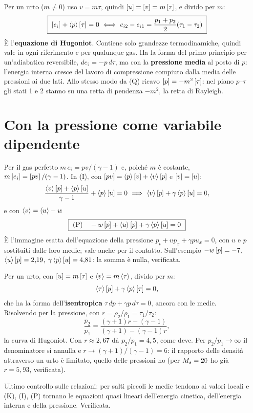 Per un urto ($m\neq0$) uso $v=m\tau$, quindi $\left[u\right]=\left[v\right]=m\left[\tau\right]$, e divido per $m$:
\[
  \boxed{\ \jp{e_i}+\av{p}\jp{\tau}=0
  \ \Longleftrightarrow\ e_{i2}-e_{i1}=\frac{p_1+p_2}{2}(\tau_1-\tau_2)\ }
\]
È l'\textbf{equazione di Hugoniot}. Contiene solo grandezze termodinamiche, quindi vale in ogni riferimento e per
qualunque gas. Ha la forma del primo principio per un'adiabatica reversibile, $de_i=-p\,d\tau$, ma con la
\textbf{pressione media} al posto di $p$: l'energia interna cresce del lavoro di compressione compiuto dalla media
delle pressioni ai due lati. Allo stesso modo da (Q) ricavo $\left[p\right]=-m^2\left[\tau\right]$: nel piano $p$--$\tau$ gli stati
1 e 2 stanno su una retta di pendenza $-m^2$, la retta di Rayleigh.

\section*{Con la pressione come variabile dipendente}
Per il gas perfetto $m\,e_i=pv/(\gamma-1)$ e, poiché $m$ è costante, $m\left[e_i\right]=\left[pv\right]/(\gamma-1)$. In (I), con
$\left[pv\right]=\left\langle p\right\rangle\left[v\right]+\left\langle v\right\rangle\left[p\right]$ e $\left[v\right]=\left[u\right]$:
\[
  \frac{\left\langle v\right\rangle\left[p\right]+\left\langle p\right\rangle\left[u\right]}{\gamma-1}+\left\langle p\right\rangle\left[u\right]=0
  \ \Longrightarrow\ \left\langle v\right\rangle\left[p\right]+\gamma\left\langle p\right\rangle\left[u\right]=0,
\]
e con $\left\langle v\right\rangle=\left\langle u\right\rangle-w$
\[
  \boxed{\ \text{(P)}\quad -w\left[p\right]+\left\langle u\right\rangle\left[p\right]+\gamma\left\langle p\right\rangle\left[u\right]=0\ }
\]
È l'immagine esatta dell'equazione della pressione $p_t+up_x+\gamma pu_x=0$, con $u$ e $p$ sostituiti dalle loro
medie; vale anche per il contatto. Sull'esempio $-w\left[p\right]=-7$, $\left\langle u\right\rangle\left[p\right]=2{,}19$, $\gamma\left\langle p\right\rangle\left[u\right]=4{,}81$:
la somma è nulla, verificata.

Per un urto, con $\left[u\right]=m\left[\tau\right]$ e $\left\langle v\right\rangle=m\left\langle \tau\right\rangle$, divido per $m$:
\[
  \left\langle \tau\right\rangle\left[p\right]+\gamma\left\langle p\right\rangle\left[\tau\right]=0,
\]
che ha la forma dell'\textbf{isentropica} $\tau\,dp+\gamma p\,d\tau=0$, ancora con le medie. Risolvendo per la
pressione, con $r=\rho_2/\rho_1=\tau_1/\tau_2$:
\[
  \frac{p_2}{p_1}=\frac{(\gamma+1)r-(\gamma-1)}{(\gamma+1)-(\gamma-1)r},
\]
la curva di Hugoniot. Con $r\approx2{,}67$ dà $p_2/p_1=4{,}5$, come deve. Per $p_2/p_1\to\infty$ il denominatore si
annulla e $r\to(\gamma+1)/(\gamma-1)=6$: il rapporto delle densità attraverso un urto è limitato, quello delle
pressioni no (per $M_{s}=20$ ho già $r=5{,}93$, verificata).

Ultimo controllo sulle relazioni: per salti piccoli le medie tendono ai valori locali e (K), (I), (P) tornano le
equazioni quasi lineari dell'energia cinetica, dell'energia interna e della pressione. Verificata.

